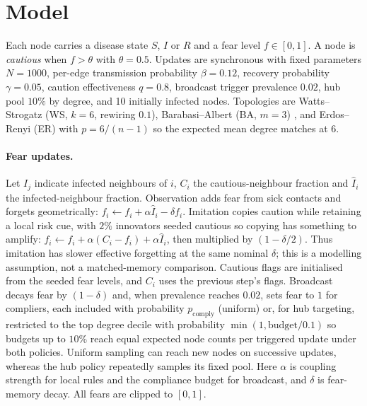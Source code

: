 \documentclass[11pt,a4paper]{article}
\begin{document}
\section{Model}
Each node carries a disease state $S$, $I$ or $R$ and a fear level
$f \in [0,1]$. A node is \emph{cautious} when $f > \theta$ with $\theta=0.5$.
Updates are synchronous with fixed parameters $N=1000$, per-edge
transmission probability $\beta=0.12$, recovery probability $\gamma=0.05$,
caution effectiveness $q=0.8$, broadcast trigger prevalence $0.02$, hub pool
$10\%$ by degree, and 10 initially infected nodes. Topologies are
Watts--Strogatz (WS, $k=6$, rewiring $0.1$), Barabasi--Albert (BA, $m=3$)
\cite{Watts1998,Barabasi1999}, and Erdos--Renyi (ER) with $p=6/(n-1)$ so the
expected mean degree matches at $6$.

\paragraph{Fear updates.} Let $I_j$ indicate infected neighbours of $i$,
$C_i$ the cautious-neighbour fraction and $\hat{I}_i$ the
infected-neighbour fraction. Observation adds fear from sick contacts and
forgets geometrically:
$f_i \leftarrow f_i + \alpha \hat{I}_i - \delta f_i$.
Imitation copies caution while retaining a local risk cue, with $2\%$
innovators seeded cautious so copying has something to amplify:
$f_i \leftarrow f_i + \alpha(C_i - f_i) + \alpha \hat{I}_i$, then multiplied
by $(1-\delta/2)$. Thus imitation has slower effective forgetting at the
same nominal $\delta$; this is a modelling assumption, not a matched-memory
comparison. Cautious flags are initialised from the seeded fear levels, and
$C_i$ uses the previous step's flags. Broadcast decays fear by $(1-\delta)$ and, when prevalence
reaches $0.02$, sets fear to $1$ for compliers, each included with probability
$p_{\text{comply}}$ (uniform) or, for hub targeting, restricted to the top
degree decile with probability $\min(1, \text{budget}/0.1)$ so budgets up to
$10\%$ reach equal expected node counts per triggered update under both
policies. Uniform sampling can reach new nodes on successive updates, whereas
the hub policy repeatedly samples its fixed pool. Here $\alpha$ is
coupling strength for local rules and the compliance budget for broadcast,
and $\delta$ is fear-memory decay. All fears are clipped to $[0,1]$.
\end{document}
